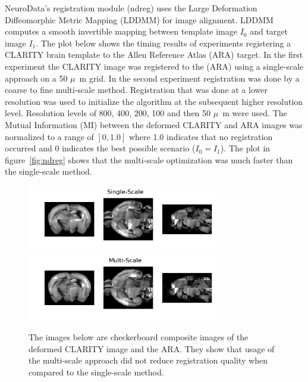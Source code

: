 \documentclass[simplex.tex]{subfiles}
\begin{document}
NeuroData’s registration module (ndreg) uses the Large Deformation
Diffeomorphic Metric Mapping (LDDMM) for image alignment.  LDDMM
computes a smooth invertible mapping between template image $I_0$ and
target image $I_1$. The plot below shows the timing results of experiments
registering a CLARITY brain template to the Allen Reference Atlas (ARA)
target.  In the first experiment the CLARITY image was registered to the
(ARA) using a single-scale approach on a 50 $\mu$~m grid.  In the second
experiment registration was done by a coarse to fine multi-scale method.
Registration that was done at a lower resolution was used to initialize
the algorithm at the subsequent higher resolution level.  Resolution
levels of 800, 400, 200, 100 and then 50 $\mu$~m were used. The Mutual
Information (MI) between the deformed CLARITY and ARA images was
normalized to a range of $[0, 1.0]$ where 1.0 indicates that no
registration occurred and 0 indicates the best possible scenario ($I_0 =
I_1$).  The plot in figure~\ref{fig:ndreg} shows that the multi-scale optimization was much faster
than the single-scale method.


\begin{figure}[h!]
\begin{cframed}
\centering
\includegraphics[width=0.75\textwidth]{./figs/ndreg-single.png}
\includegraphics[width=0.75\textwidth]{./figs/ndreg-multiscale.png}
\caption{
  The images below are checkerboard composite images of the deformed
  CLARITY image and the ARA.  They show that usage of the multi-scale
  approach did not reduce registration quality when compared to the
  single-scale method.
}
\label{fig:ndregChecker}
\end{cframed}
\end{figure}
\end{document}
